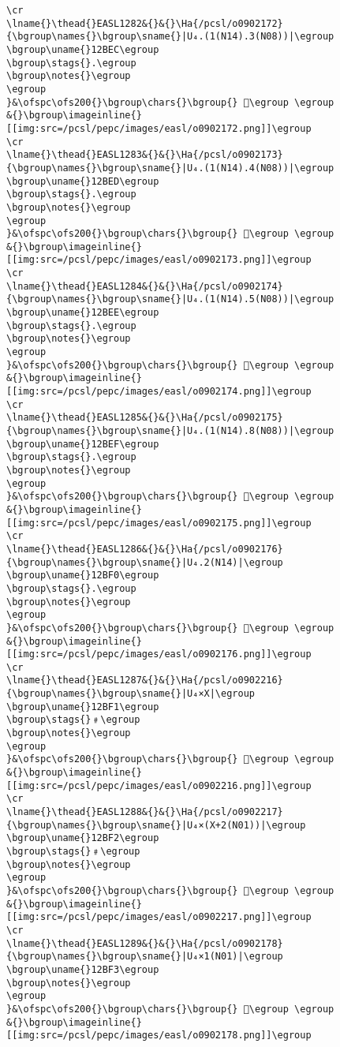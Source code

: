 \begin{verbatim}
\cr
\lname{}\thead{}EASL1282&{}&{}\Ha{/pcsl/o0902172}{\bgroup\names{}\bgroup\sname{}|U₄.(1(N14).3(N08))|\egroup
\bgroup\uname{}12BEC\egroup
\bgroup\stags{}.\egroup
\bgroup\notes{}\egroup
\egroup
}&\ofspc\ofs200{}\bgroup\chars{}\bgroup{} 𒯬\egroup \egroup
&{}\bgroup\imageinline{}[[img:src=/pcsl/pepc/images/easl/o0902172.png]]\egroup
\cr
\lname{}\thead{}EASL1283&{}&{}\Ha{/pcsl/o0902173}{\bgroup\names{}\bgroup\sname{}|U₄.(1(N14).4(N08))|\egroup
\bgroup\uname{}12BED\egroup
\bgroup\stags{}.\egroup
\bgroup\notes{}\egroup
\egroup
}&\ofspc\ofs200{}\bgroup\chars{}\bgroup{} 𒯭\egroup \egroup
&{}\bgroup\imageinline{}[[img:src=/pcsl/pepc/images/easl/o0902173.png]]\egroup
\cr
\lname{}\thead{}EASL1284&{}&{}\Ha{/pcsl/o0902174}{\bgroup\names{}\bgroup\sname{}|U₄.(1(N14).5(N08))|\egroup
\bgroup\uname{}12BEE\egroup
\bgroup\stags{}.\egroup
\bgroup\notes{}\egroup
\egroup
}&\ofspc\ofs200{}\bgroup\chars{}\bgroup{} 𒯮\egroup \egroup
&{}\bgroup\imageinline{}[[img:src=/pcsl/pepc/images/easl/o0902174.png]]\egroup
\cr
\lname{}\thead{}EASL1285&{}&{}\Ha{/pcsl/o0902175}{\bgroup\names{}\bgroup\sname{}|U₄.(1(N14).8(N08))|\egroup
\bgroup\uname{}12BEF\egroup
\bgroup\stags{}.\egroup
\bgroup\notes{}\egroup
\egroup
}&\ofspc\ofs200{}\bgroup\chars{}\bgroup{} 𒯯\egroup \egroup
&{}\bgroup\imageinline{}[[img:src=/pcsl/pepc/images/easl/o0902175.png]]\egroup
\cr
\lname{}\thead{}EASL1286&{}&{}\Ha{/pcsl/o0902176}{\bgroup\names{}\bgroup\sname{}|U₄.2(N14)|\egroup
\bgroup\uname{}12BF0\egroup
\bgroup\stags{}.\egroup
\bgroup\notes{}\egroup
\egroup
}&\ofspc\ofs200{}\bgroup\chars{}\bgroup{} 𒯰\egroup \egroup
&{}\bgroup\imageinline{}[[img:src=/pcsl/pepc/images/easl/o0902176.png]]\egroup
\cr
\lname{}\thead{}EASL1287&{}&{}\Ha{/pcsl/o0902216}{\bgroup\names{}\bgroup\sname{}|U₄×X|\egroup
\bgroup\uname{}12BF1\egroup
\bgroup\stags{}﹟\egroup
\bgroup\notes{}\egroup
\egroup
}&\ofspc\ofs200{}\bgroup\chars{}\bgroup{} 𒯱\egroup \egroup
&{}\bgroup\imageinline{}[[img:src=/pcsl/pepc/images/easl/o0902216.png]]\egroup
\cr
\lname{}\thead{}EASL1288&{}&{}\Ha{/pcsl/o0902217}{\bgroup\names{}\bgroup\sname{}|U₄×(X+2(N01))|\egroup
\bgroup\uname{}12BF2\egroup
\bgroup\stags{}﹟\egroup
\bgroup\notes{}\egroup
\egroup
}&\ofspc\ofs200{}\bgroup\chars{}\bgroup{} 𒯲\egroup \egroup
&{}\bgroup\imageinline{}[[img:src=/pcsl/pepc/images/easl/o0902217.png]]\egroup
\cr
\lname{}\thead{}EASL1289&{}&{}\Ha{/pcsl/o0902178}{\bgroup\names{}\bgroup\sname{}|U₄×1(N01)|\egroup
\bgroup\uname{}12BF3\egroup
\bgroup\notes{}\egroup
\egroup
}&\ofspc\ofs200{}\bgroup\chars{}\bgroup{} 𒯳\egroup \egroup
&{}\bgroup\imageinline{}[[img:src=/pcsl/pepc/images/easl/o0902178.png]]\egroup

\end{verbatim}
